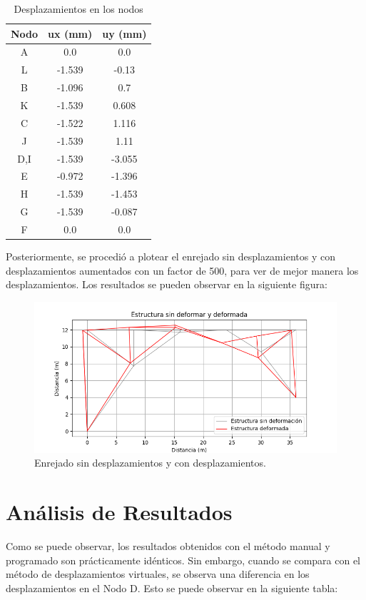 \documentclass{article}  %
\begin{document}
\begin{table}[h!]
  \centering
  \begin{tabular}{ccc}
  \hline
  \textbf{Nodo} & \textbf{ux (mm)} & \textbf{uy (mm)} \\
  \hline
  A  & 0.0    & 0.0    \\
  L  & -1.539 & -0.13  \\
  B  & -1.096 & 0.7    \\
  K  & -1.539 & 0.608  \\
  C  & -1.522 & 1.116  \\
  J  & -1.539 & 1.11   \\
  D,I  & -1.539 & -3.055 \\
  E  & -0.972 & -1.396 \\
  H  & -1.539 & -1.453 \\
  G & -1.539 & -0.087 \\
  F & 0.0    & 0.0    \\
  \hline
  \end{tabular}
  \caption{Desplazamientos en los nodos}
\end{table}

\newpage
Posteriormente, se procedió a plotear el enrejado sin desplazamientos y con desplazamientos aumentados con un factor de 500, para ver de mejor manera los desplazamientos. Los resultados se pueden observar en la siguiente figura:
\begin{figure}[h]
  \centering
  \includegraphics[width=1\textwidth]{imagenes/E0_matplotlib.png}
  \caption{Enrejado sin desplazamientos y con desplazamientos.}
  \label{fig:1}
\end{figure}


\section{Análisis de Resultados}
Como se puede observar, los resultados obtenidos con el método manual y programado son prácticamente idénticos. Sin embargo, cuando se compara con el método de desplazamientos virtuales, se observa una diferencia en los desplazamientos en el Nodo D. Esto se puede observar en la siguiente tabla:
\end{document}
